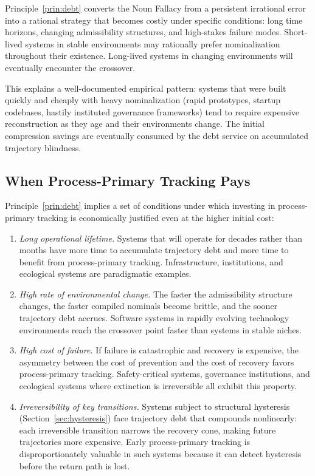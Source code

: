 \documentclass[12pt, a4paper]{article}
\theoremstyle{plain}
\theoremstyle{definition}
\theoremstyle{remark}
\begin{document}
Principle~\ref{prin:debt} converts the Noun Fallacy from a persistent
irrational error into a rational strategy that becomes costly under specific
conditions: long time horizons, changing admissibility structures, and
high-stakes failure modes. Short-lived systems in stable environments may
rationally prefer nominalization throughout their existence. Long-lived systems
in changing environments will eventually encounter the crossover.

This explains a well-documented empirical pattern: systems that were built
quickly and cheaply with heavy nominalization (rapid prototypes, startup
codebases, hastily instituted governance frameworks) tend to require expensive
reconstruction as they age and their environments change. The initial
compression savings are eventually consumed by the debt service on accumulated
trajectory blindness.

\subsection{When Process-Primary Tracking Pays}

Principle~\ref{prin:debt} implies a set of conditions under which investing
in process-primary tracking is economically justified even at the higher
initial cost:

\begin{enumerate}[leftmargin=*, label=(\roman*)]
\item \emph{Long operational lifetime.} Systems that will operate for decades
rather than months have more time to accumulate trajectory debt and more time
to benefit from process-primary tracking. Infrastructure, institutions, and
ecological systems are paradigmatic examples.

\item \emph{High rate of environmental change.} The faster the admissibility
structure changes, the faster compiled nominals become brittle, and the sooner
trajectory debt accrues. Software systems in rapidly evolving technology
environments reach the crossover point faster than systems in stable niches.

\item \emph{High cost of failure.} If failure is catastrophic and recovery
is expensive, the asymmetry between the cost of prevention and the cost of
recovery favors process-primary tracking. Safety-critical systems, governance
institutions, and ecological systems where extinction is irreversible all
exhibit this property.

\item \emph{Irreversibility of key transitions.} Systems subject to structural
hysteresis (Section~\ref{sec:hysteresis}) face trajectory debt that compounds
nonlinearly: each irreversible transition narrows the recovery cone, making
future trajectories more expensive. Early process-primary tracking is
disproportionately valuable in such systems because it can detect hysteresis
before the return path is lost.
\end{enumerate}
\end{document}
